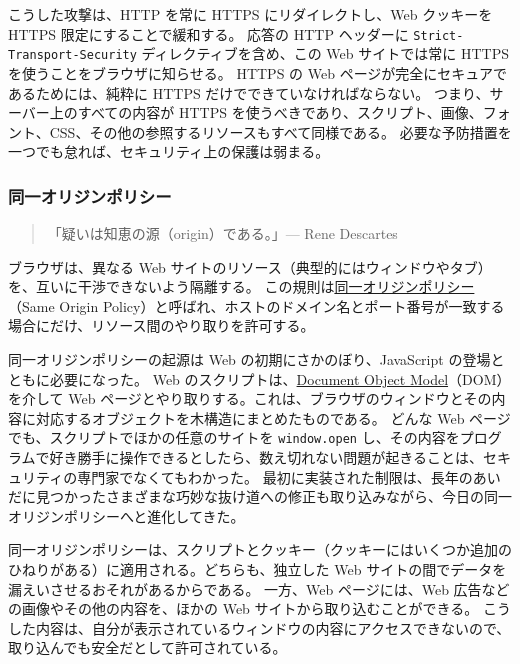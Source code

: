 \documentclass[uplatex]{jsarticle}
\def\label#1{}%
\begin{document}
こうした攻撃は、HTTP を常に HTTPS にリダイレクトし、Web クッキーを HTTPS 限定にすることで緩和する。
応答の HTTP ヘッダーに \texttt{Strict-Transport-Security} ディレクティブを含め、この Web サイトでは常に HTTPS を使うことをブラウザに知らせる。
HTTPS の Web ページが完全にセキュアであるためには、純粋に HTTPS だけでできていなければならない。
つまり、サーバー上のすべての内容が HTTPS を使うべきであり、スクリプト、画像、フォント、CSS、その他の参照するリソースもすべて同様である。
必要な予防措置を一つでも怠れば、セキュリティ上の保護は弱まる。

\subsubsection{同一オリジンポリシー}\label{subsec:ch11-sop}

\begin{quote}
「疑いは知恵の源（origin）である。」\hfill --- Rene Descartes
\end{quote}

\begin{dfn}[同一オリジンポリシー]\label{dfn:ch11-same-origin-policy}
ブラウザは、異なる Web サイトのリソース（典型的にはウィンドウやタブ）を、互いに干渉できないよう隔離する。
この規則は\underline{同一オリジンポリシー}（Same Origin Policy）と呼ばれ、ホストのドメイン名とポート番号が一致する場合にだけ、リソース間のやり取りを許可する。
\end{dfn}

同一オリジンポリシーの起源は Web の初期にさかのぼり、JavaScript の登場とともに必要になった。
Web のスクリプトは、\underline{Document Object Model}（DOM）を介して Web ページとやり取りする。これは、ブラウザのウィンドウとその内容に対応するオブジェクトを木構造にまとめたものである。
どんな Web ページでも、スクリプトでほかの任意のサイトを \texttt{window.open} し、その内容をプログラムで好き勝手に操作できるとしたら、数え切れない問題が起きることは、セキュリティの専門家でなくてもわかった。
最初に実装された制限は、長年のあいだに見つかったさまざまな巧妙な抜け道への修正も取り込みながら、今日の同一オリジンポリシーへと進化してきた。

同一オリジンポリシーは、スクリプトとクッキー（クッキーにはいくつか追加のひねりがある）に適用される。どちらも、独立した Web サイトの間でデータを漏えいさせるおそれがあるからである。
一方、Web ページには、Web 広告などの画像やその他の内容を、ほかの Web サイトから取り込むことができる。
こうした内容は、自分が表示されているウィンドウの内容にアクセスできないので、取り込んでも安全だとして許可されている。
\end{document}
